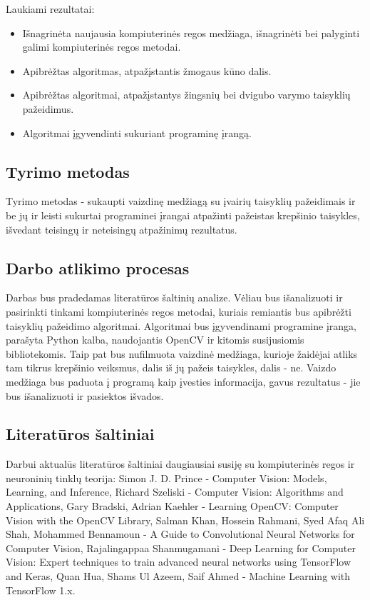 \documentclass{VUMIFPSbakalaurinis}
\begin{document}
Laukiami rezultatai:
\begin{itemize}[topsep=5pt,itemsep=-1ex,partopsep=2ex,parsep=2ex]
 \item Išnagrinėta naujausia kompiuterinės regos medžiaga, išnagrinėti bei palyginti galimi kompiuterinės regos metodai.
 \item Apibrėžtas algoritmas, atpažįstantis žmogaus kūno dalis.
 \item Apibrėžtas algoritmai, atpažįstantys žingsnių bei dvigubo varymo taisyklių pažeidimus.
 \item Algoritmai įgyvendinti sukuriant programinę įrangą.
\end{itemize}

\subsection{Tyrimo metodas}
Tyrimo metodas - sukaupti vaizdinę medžiagą su įvairių taisyklių pažeidimais ir be jų ir leisti sukurtai programinei įrangai atpažinti pažeistas krepšinio taisykles, išvedant teisingų ir neteisingų atpažinimų rezultatus.

\subsection{Darbo atlikimo procesas}
Darbas bus pradedamas literatūros šaltinių analize. Vėliau bus išanalizuoti ir pasirinkti tinkami kompiuterinės regos metodai, kuriais remiantis bus apibrėžti taisyklių pažeidimo algoritmai. Algoritmai bus įgyvendinami programine įranga, parašyta Python kalba, naudojantis OpenCV ir kitomis susijusiomis bibliotekomis. Taip pat bus nufilmuota vaizdinė medžiaga, kurioje žaidėjai atliks tam tikrus krepšinio veiksmus, dalis iš jų pažeis taisykles, dalis - ne. Vaizdo medžiaga bus paduota į programą kaip įvesties informacija, gavus rezultatus - jie bus išanalizuoti ir pasiektos išvados. 

\subsection{Literatūros šaltiniai}
Darbui aktualūs literatūros šaltiniai daugiausiai susiję su kompiuterinės regos ir neuroninių tinklų teorija: Simon J. D. Prince - Computer Vision: Models, Learning, and Inference, Richard Szeliski - Computer Vision: Algorithms and Applications, Gary Bradski, Adrian Kaehler - Learning OpenCV: Computer Vision with the OpenCV Library, Salman Khan, Hossein Rahmani, Syed Afaq Ali Shah, Mohammed Bennamoun - A Guide to Convolutional Neural Networks for Computer Vision, Rajalingappaa Shanmugamani - Deep Learning for Computer Vision: Expert techniques to train advanced neural networks using TensorFlow and Keras, Quan Hua, Shams Ul Azeem, Saif Ahmed - Machine Learning with TensorFlow 1.x.
\end{document}
